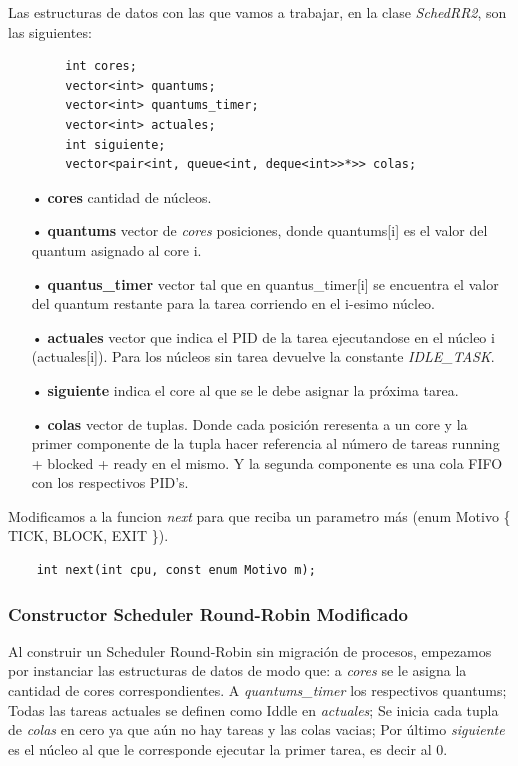 \documentclass[a4paper]{article}
\begin{document}
Las estructuras de datos con las que vamos a trabajar, en la clase \emph{SchedRR2}, son las siguientes:
	\begin{codesnippet}
	\begin{verbatim}
		int cores;
		vector<int> quantums;
		vector<int> quantums_timer;
		vector<int> actuales;
		int siguiente;
		vector<pair<int, queue<int, deque<int>>*>> colas;
	\end{verbatim}
	\end{codesnippet}
	
	\begin{itemize}
	\item[•]\textbf{cores} cantidad de n\'ucleos.
	\item[•]\textbf{quantums} vector de \emph{cores} posiciones, donde quantums[i] es el valor del quantum asignado al core i.
	\item[•]\textbf{quantus_timer}  vector tal que en quantus_timer[i] se encuentra el valor del quantum restante para la tarea corriendo en el i-esimo núcleo.
	\item[•]\textbf{actuales} vector que indica el PID de la tarea ejecutandose en el núcleo i (actuales[i]). Para los núcleos sin tarea devuelve la constante \textit{IDLE\_TASK}.
	\item[•]\textbf{siguiente} indica el core al que se le debe asignar la próxima tarea.
	\item[•]\textbf{colas} vector de tuplas. Donde cada posición reresenta a un core y la primer componente de la tupla hacer referencia al número de tareas running + blocked + ready en el mismo. Y la segunda componente es una cola FIFO con los respectivos PID's.  
	\end{itemize}	
	
\noindent  Modificamos a la funcion \emph{next} para que reciba un parametro m\'as (enum Motivo \{ TICK, BLOCK, EXIT \}).
	\begin{codesnippet}
	\begin{verbatim}
    int next(int cpu, const enum Motivo m);
	\end{verbatim}
	\end{codesnippet}
		
\subsubsection*{Constructor Scheduler Round-Robin Modificado}		

Al construir un Scheduler Round-Robin sin migración de procesos, empezamos por instanciar las estructuras de datos de modo que: a \emph{cores} se le asigna la cantidad de cores correspondientes. A \emph{quantums\_timer} los respectivos quantums; Todas las tareas actuales se definen como Iddle en \emph{actuales}; Se inicia cada tupla de \emph{colas} en cero ya que aún no hay tareas y las colas vacias; Por último \emph{siguiente} es el n\'ucleo al que le corresponde ejecutar la primer tarea, es decir al 0.
\end{document}
